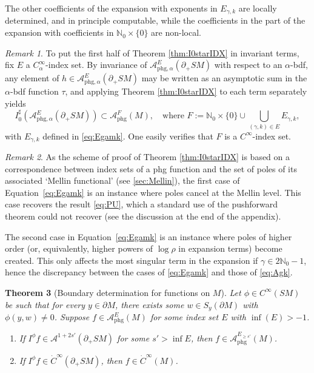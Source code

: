 \documentclass[JEP,XML,SOM,Unicode,NoFloatCountersInSection, NoEqCountersInSection,published]{cedram}
\newenvironment{enumeratei}
{\bgroup\def\theenumi{\roman{enumi}}\def\theenumii{\arabic{enumii}}\begin{enumerate}}
{\end{enumerate}\egroup}
\theoremstyle{plain}
\newtheorem{Theorem}{Theorem}[section]
\theoremstyle{definition}
\theoremstyle{remark}
\newtheorem{Remark}[Theorem]{Remark}
\def\Nm{{\mathbb{N}}}
\def\A{\mathcal{A}}
\newcommand{\phg}{\mathrm{phg}}
\begin{document}
The other coefficients of the expansion with exponents in $E_{\gamma,k}$ are locally determined, and in principle computable, while the coefficients in the part of the expansion with coefficients in $\Nm_0\times\{0\}$ are non-local.

\begin{Remark}
To put the first half of Theorem \ref{thm:I0starIDX} in invariant terms, fix $E$ a $C_{\alpha}^\infty$-index set. By invariance of $\A_{\phg,\alpha}^E (\partial_+ SM)$ with respect to an $\alpha$-bdf, any element of $h\in \A_{\phg,\alpha}^E (\partial_+ SM)$ may be written as an asymptotic sum in the $\alpha$-bdf function $\tau$, and applying Theorem \ref{thm:I0starIDX} to each term separately yields
\begin{equation*}
I_0^\sharp \left(\A_{\phg,\alpha}^E (\partial_+ SM) \right) \subset \A_{\phg}^F (M), \quad \text{where } F:= \Nm_0 \times \{0\} \cup \bigcup_{(\gamma,k)\in E} E_{\gamma,k},
\end{equation*}
with $E_{\gamma,k}$ defined in \eqref{eq:Egamk}. One easily verifies that $F$ is a $C^\infty$-index set.
\end{Remark}

\begin{Remark}
As the scheme of proof of Theorem \ref{thm:I0starIDX} is based on a correspondence between index sets of a phg function and the set of poles of its associated `Mellin functional' (see \ref{sec:Mellin}), the first case of Equation~\eqref{eq:Egamk} is an instance where poles cancel at the Mellin level. This case recovers the result \eqref{eq:PU}, which a standard use of the pushforward theorem could not recover (see the discussion at the end of the appendix).

The second case in Equation~\eqref{eq:Egamk} is an instance where poles of higher order (or, equivalently, higher powers of $\log \rho$ in expansion terms) become created. This only affects the most singular term in the expansion if $\gamma\in 2\Nm_0-1$, hence the discrepancy between the cases of \eqref{eq:Egamk} and those of \eqref{eq:Agk}.
\end{Remark}

 \label{sec:consequences}


\begin{Theorem}[Boundary determination for functions on $M$]\label{thm:bdrydet}
Let $\phi\in C^\infty(SM)$ be such that for every $y\in \partial M$, there exists some $w\in S_y(\partial M)$ with $\phi(y,w)\ne 0$.
Suppose $f\in \A^E_{\phg}(M)$ for some index set $E$ with $\inf (E)>-1$.
\begin{enumeratei}
\item\label{thm:bdrydeti}
If $I^\phi f \in \A^{1+2s'} (\partial_+ SM)$ for some $s'>\inf E$, then $f\in \A^{E_{\geq s'}}_{\phg}(M)$.

\item\label{thm:bdrydetii}
If $I^\phi f \in \dot{C}^\infty (\partial_+ SM)$, then $f\in \dot{C}^\infty(M)$.
\end{enumeratei}
\end{Theorem}
\end{document}
